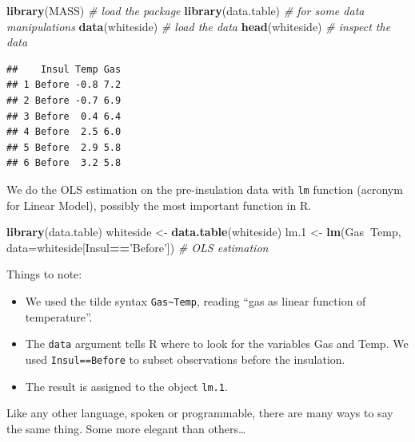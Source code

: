 \documentclass[]{book}
\newenvironment{Shaded}{\begin{snugshade}}{\end{snugshade}}
\newcommand{\KeywordTok}[1]{\textcolor[rgb]{0.13,0.29,0.53}{\textbf{#1}}}
\newcommand{\DataTypeTok}[1]{\textcolor[rgb]{0.13,0.29,0.53}{#1}}
\newcommand{\DecValTok}[1]{\textcolor[rgb]{0.00,0.00,0.81}{#1}}
\newcommand{\StringTok}[1]{\textcolor[rgb]{0.31,0.60,0.02}{#1}}
\newcommand{\CommentTok}[1]{\textcolor[rgb]{0.56,0.35,0.01}{\textit{#1}}}
\newcommand{\OperatorTok}[1]{\textcolor[rgb]{0.81,0.36,0.00}{\textbf{#1}}}
\newcommand{\NormalTok}[1]{#1}
\providecommand{\tightlist}{%
  \setlength{\itemsep}{0pt}\setlength{\parskip}{0pt}}
\theoremstyle{definition}
\theoremstyle{definition}
\theoremstyle{definition}
\theoremstyle{remark}
\begin{document}
\begin{Shaded}
\begin{Highlighting}[]
\KeywordTok{library}\NormalTok{(MASS) }\CommentTok{# load the package}
\KeywordTok{library}\NormalTok{(data.table) }\CommentTok{# for some data manipulations}
\KeywordTok{data}\NormalTok{(whiteside) }\CommentTok{# load the data}
\KeywordTok{head}\NormalTok{(whiteside) }\CommentTok{# inspect the data}
\end{Highlighting}
\end{Shaded}

\begin{verbatim}
##    Insul Temp Gas
## 1 Before -0.8 7.2
## 2 Before -0.7 6.9
## 3 Before  0.4 6.4
## 4 Before  2.5 6.0
## 5 Before  2.9 5.8
## 6 Before  3.2 5.8
\end{verbatim}

We do the OLS estimation on the pre-insulation data with \texttt{lm}
function (acronym for Linear Model), possibly the most important
function in R.

\begin{Shaded}
\begin{Highlighting}[]
\KeywordTok{library}\NormalTok{(data.table)}
\NormalTok{whiteside <-}\StringTok{ }\KeywordTok{data.table}\NormalTok{(whiteside)}
\NormalTok{lm.}\DecValTok{1}\NormalTok{ <-}\StringTok{ }\KeywordTok{lm}\NormalTok{(Gas}\OperatorTok{~}\NormalTok{Temp, }\DataTypeTok{data=}\NormalTok{whiteside[Insul}\OperatorTok{==}\StringTok{'Before'}\NormalTok{]) }\CommentTok{# OLS estimation }
\end{Highlighting}
\end{Shaded}

Things to note:

\begin{itemize}
\tightlist
\item
  We used the tilde syntax \texttt{Gas\textasciitilde{}Temp}, reading
  ``gas as linear function of temperature''.
\item
  The \texttt{data} argument tells R where to look for the variables Gas
  and Temp. We used
  \texttt{Insul==\textquotesingle{}Before\textquotesingle{}} to subset
  observations before the insulation.
\item
  The result is assigned to the object \texttt{lm.1}.
\end{itemize}

Like any other language, spoken or programmable, there are many ways to
say the same thing. Some more elegant than others\ldots{}
\end{document}
